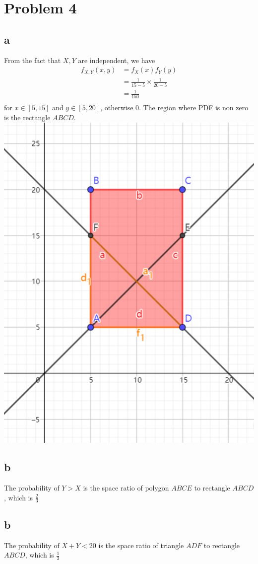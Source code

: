 \documentclass[12pt,letterpaper]{article}
\begin{document}
\section*{Problem 4}
    \subsection*{a}
        From the fact that $X, Y$ are independent, we have
        \begin{equation*}
            \begin{aligned}
                f_{X, Y}(x, y) &= f_{X}(x) f_{Y}(y) \\
                &= \frac{1}{15 - 5} \times \frac{1}{20 - 5} \\
                &= \frac{1}{150} \\
            \end{aligned}
        \end{equation*}
        for $x \in [5, 15]$ and $y \in [5, 20]$, otherwise 0.
        The region where PDF is non zero is the rectangle $ABCD$.
        {\center\includegraphics[scale=0.7]{rect.png}}
    \subsection*{b}
        The probability of $Y > X$ is the space ratio of polygon $ABCE$ to rectangle $ABCD$, which is $\frac{2}{3}$
    \subsection*{b}
        The probability of $X + Y < 20$ is the space ratio of triangle $ADF$ to rectangle $ABCD$, which is $\frac{1}{3}$
\end{document}
